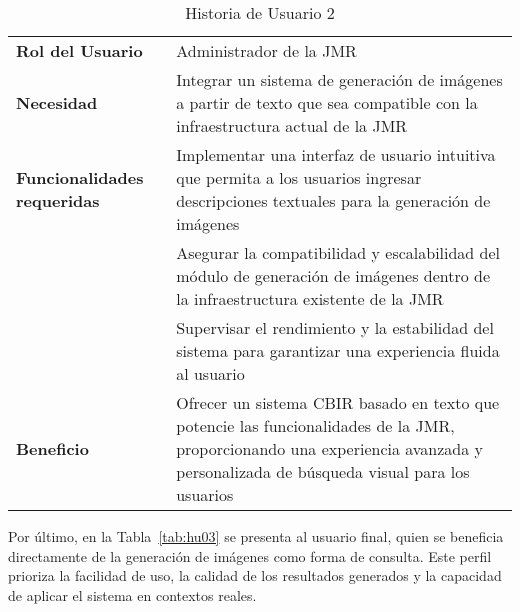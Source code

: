 \begin{table}[ht]
    \centering
    \renewcommand{\arraystretch}{1.5}
    \begin{tabular}{|>{\columncolor{gray!10}}p{4cm}|p{10cm}|}
        \hline
        \rowcolor{gray!30}
        \multicolumn{2}{|c|}{\textbf{Historia de Usuario 2}} \\
        \hline
        \textbf{Rol del Usuario} & Administrador de la JMR \\
        \hline
        \textbf{Necesidad} & Integrar un sistema de generación de imágenes a partir de texto que sea compatible con la infraestructura actual de la JMR \\
        \hline
        \textbf{Funcionalidades requeridas} & Implementar una interfaz de usuario intuitiva que permita a los usuarios ingresar descripciones textuales para la generación de imágenes
        \\ & Asegurar la compatibilidad y escalabilidad del módulo de generación de imágenes dentro de la infraestructura existente de la JMR
        \\ & Supervisar el rendimiento y la estabilidad del sistema para garantizar una experiencia fluida al usuario \\
        \hline
        \textbf{Beneficio} & Ofrecer un sistema CBIR basado en texto que potencie las funcionalidades de la JMR, proporcionando una experiencia avanzada y personalizada de búsqueda visual para los usuarios \\
        \hline
    \end{tabular}
    \caption{Historia de Usuario 2}
    \label{tab:hu02}
\end{table}

Por último, en la Tabla~\ref{tab:hu03} se presenta al usuario final, quien se beneficia directamente de la generación de imágenes como forma de consulta. Este perfil prioriza la facilidad de uso, la calidad de los resultados generados y la capacidad de aplicar el sistema en contextos reales.

